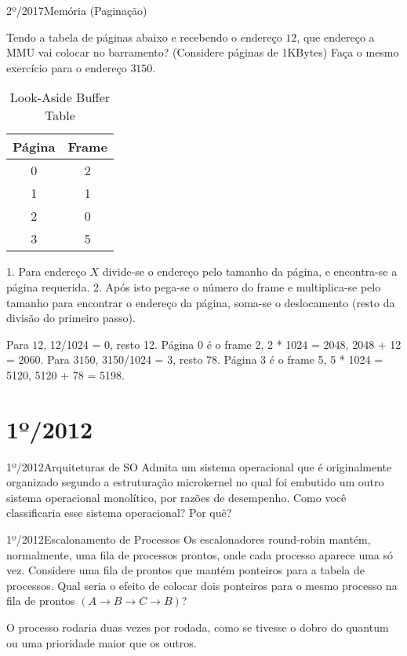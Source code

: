 \begin{exercicio}
  {2º/2017}{Memória (Paginação)}
  {Tendo a tabela de páginas abaixo e recebendo o endereço $12$, que endereço a MMU vai colocar no barramento? (Considere páginas de 1KBytes)
  Faça o mesmo exercício para o endereço $3150$.
  \begin{table}[]
    \centering
    \caption{Look-Aside Buffer Table}
    \label{tab:pag_to_frame}
    \begin{tabular}{cc}
      \hline \hline
    Página & Frame \\ \hline
    0      & 2     \\
    1      & 1     \\
    2      & 0     \\
    3      & 5     \\ \hline \hline
    \end{tabular}
    \end{table}}
    
    1. Para endereço $X$ divide-se o endereço pelo tamanho da página, e encontra-se a página requerida.
    2. Após isto pega-se o número do frame e multiplica-se pelo tamanho para encontrar o endereço da página, soma-se o deslocamento (resto da divisão do primeiro passo).

    Para $12$, 12/1024 = 0, resto 12. Página 0 é o frame 2, 2 * 1024 = 2048, 2048 + 12 = 2060.
    Para $3150$, 3150/1024 = 3, resto 78. Página 3 é o frame 5, 5 * 1024 = 5120, 5120 + 78 = 5198.
\end{exercicio}



\section{1º/2012}
\begin{exercicio}
  {1º/2012}{Arquiteturas de SO}
  {Admita um sistema operacional que é originalmente organizado segundo a estruturação microkernel no qual foi embutido um outro sistema operacional monolítico, por razões de desempenho. Como você classificaria esse sistema operacional? Por quê?}
\end{exercicio}

\begin{exercicio}
  {1º/2012}{Escalonamento de Processos}
  {Os escalonadores round-robin mantém, normalmente, uma fila de processos prontos, onde cada processo aparece uma só vez. Considere uma fila de prontos que mantém ponteiros para a tabela de processos. Qual seria o efeito de colocar dois ponteiros para o mesmo processo na fila de prontos $(A \rightarrow B \rightarrow C \rightarrow B)$?
  }

  O processo rodaria duas vezes por rodada, como se tivesse o dobro do quantum ou uma prioridade maior que os outros.
\end{exercicio}

